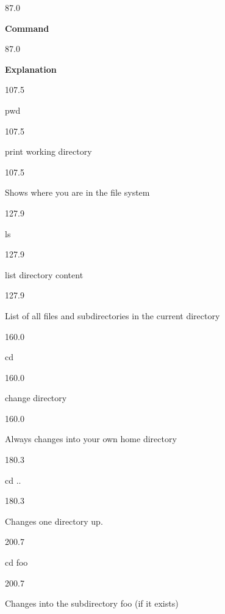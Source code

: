 \documentclass{aslab}
\newcommand*\cell{\small\baselineskip=12bp\raggedright}
\begin{document}
\begin{region}[x=61.0,width=68,free]{87.0}
\cell\bfseries Command
\end{region}
\begin{region}[x=256.1,width=278,free]{87.0}
\cell\bfseries Explanation
\end{region}

\begin{region}[x=61.0,width=68,free]{107.5}\cell pwd\end{region}
\begin{region}[x=137.8,width=110,free]{107.5}\cell print working directory\end{region}
\begin{region}[x=256.1,width=278,free]{107.5}\cell
Shows where you are in the file system
\end{region}

\begin{region}[x=61.0,width=68,free]{127.9}\cell ls\end{region}
\begin{region}[x=137.8,width=110,free]{127.9}\cell list directory content\end{region}
\begin{region}[x=256.1,width=278,free]{127.9}\cell
List of all files and subdirectories in the current directory
\end{region}

\begin{region}[x=61.0,width=68,free]{160.0}\cell cd\end{region}
\begin{region}[x=137.8,width=110,free]{160.0}\cell change directory\end{region}
\begin{region}[x=256.1,width=278,free]{160.0}\cell
Always changes into your own home directory
\end{region}

\begin{region}[x=61.0,width=68,free]{180.3}\cell cd ..\end{region}
\begin{region}[x=256.1,width=278,free]{180.3}\cell
Changes one directory up.
\end{region}

\begin{region}[x=61.0,width=68,free]{200.7}\cell cd foo\end{region}
\begin{region}[x=256.1,width=278,free]{200.7}\cell
Changes into the subdirectory foo (if it exists)
\end{region}
\end{document}
